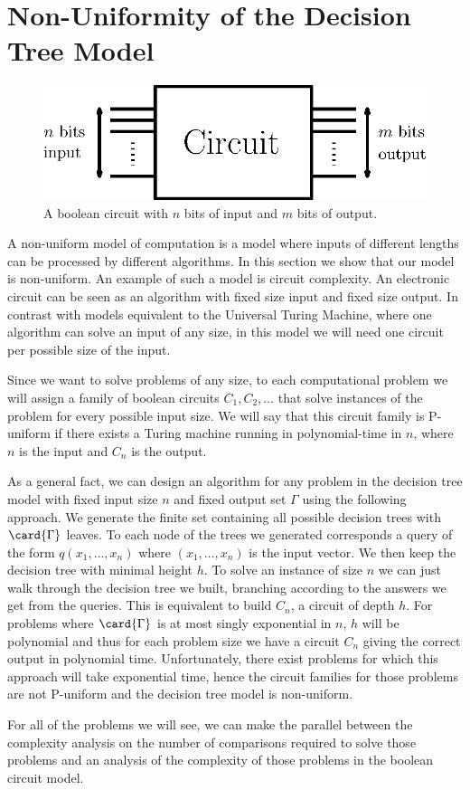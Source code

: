 \section{Non-Uniformity of the Decision Tree Model}
\label{tree:sorting:nonuniformity}

\begin{figure}
\center
\includegraphics[height=0.2\textheight]{fig/sorting/model/circuit}
\caption{A boolean circuit with \(n\) bits of input and \(m\) bits of output.}
\label{fig:sorting:nonuniformity:circuit}
\end{figure}

A non-uniform model of computation is a model where inputs of different
lengths can be processed by different algorithms. In this section we show that
our model is non-uniform. An example of such a model is circuit complexity. An
electronic circuit can be seen as an algorithm with fixed size input and fixed
size output. In contrast with models equivalent to the Universal Turing
Machine, where one algorithm can solve an input of any size, in this model we
will need one circuit per possible size of the input.

Since we want to solve problems of any size, to each computational problem we
will assign a family of boolean circuits \(C_1,C_2,\ldots\) that solve
instances of the problem for every possible input size. We will say that this
circuit family is P-uniform if there exists a Turing machine running in
polynomial-time in \(n\), where \(n\) is the input and \(C_n\) is the output.

As a general fact, we can design an algorithm for any problem in the decision
tree model with fixed input size \(n\) and fixed output set \(\Gamma\) using
the following approach. We generate the finite set containing all
possible decision trees with \(\card{\Gamma}\) leaves. To each node of the
trees we generated corresponds a query of the form \(q(x_1,\ldots,x_n)\) where
\((x_1,\ldots,x_n)\) is the input vector. We then keep the decision tree with
minimal height \(h\). To solve an instance of size \(n\) we can just walk
through the decision tree we built, branching according to the answers we get
from the queries. This is equivalent to build \(C_n\), a circuit of depth
\(h\). For problems where \(\card{\Gamma}\) is at most singly exponential in
\(n\), \(h\) will be polynomial and thus for each problem size we have a
circuit \(C_n\) giving the correct output in polynomial time.  Unfortunately,
there exist problems for which this approach will take exponential time, hence
the circuit families for those problems are not P-uniform and the decision tree
model is non-uniform.

For all of the problems we will see, we can make the parallel between the
complexity analysis on the number of comparisons required to solve
those problems and an analysis of the complexity of those problems in the
boolean circuit model.
